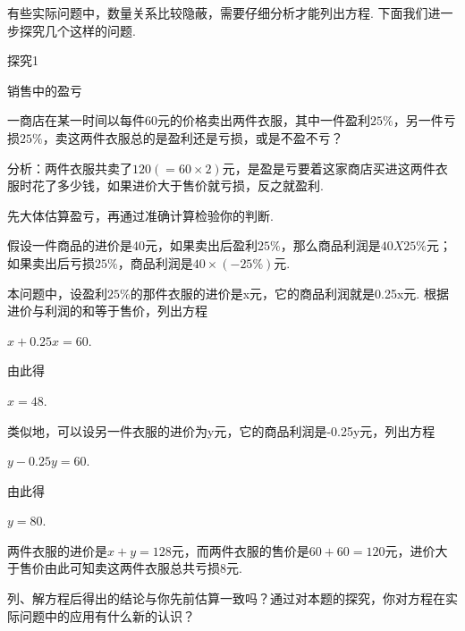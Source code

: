 \documentclass{article}
\begin{document}
\begin{example}

有些实际问题中，数量关系比较隐蔽，需要仔细分析才能列出方程. 下面我们进一步探究几个这样的问题. \newline

探究1\newline

销售中的盈亏\newline

一商店在某一时间以每件60元的价格卖出两件衣服，其中一件盈利$25\%$，另一件亏损$25\%$，卖这两件衣服总的是盈利还是亏损，或是不盈不亏？\newline

分析：两件衣服共卖了$120(=60\times2)$元，是盈是亏要着这家商店买进这两件衣服时花了多少钱，如果进价大于售价就亏损，反之就盈利. \newline

先大体估算盈亏，再通过准确计算检验你的判断. \newline

假设一件商品的进价是40元，如果卖出后盈利$25\%$，那么商品利润是$40X25\%$元；如果卖出后亏损$25\%$，商品利润是$40\times(-25\%)$元. \newline

本问题中，设盈利$25\%$的那件衣服的进价是x元，它的商品利润就是0.25x元. 根据进价与利润的和等于售价，列出方程\newline

$x+0.25x=60$.\newline

由此得\newline

$x=48$.\newline

类似地，可以设另一件衣服的进价为y元，它的商品利润是-0.25y元，列出方程\newline

$y-0.25y=60$.\newline

由此得\newline

$y=80$.\newline

两件衣服的进价是$x+y=128$元，而两件衣服的售价是$60+60=120$元，进价大于售价由此可知卖这两件衣服总共亏损8元. \newline

列、解方程后得出的结论与你先前估算一致吗？通过对本题的探究，你对方程在实际问题中的应用有什么新的认识？\newline


\end{example}
\end{document}
